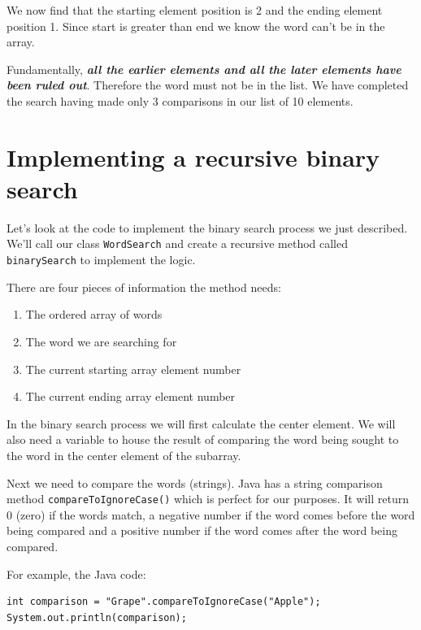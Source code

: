 We now find that the starting element position is 2 and the ending element position 1. Since start is greater than end we know the word can't be in the array. 

Fundamentally, \textbf{\textit{all the earlier elements and all the later elements have been ruled out}}. Therefore the word must not be in the list. We have completed the search having made only 3 comparisons in our list of 10 elements.

\section{Implementing a recursive binary search}

Let's look at the code to implement the binary search process we just described. We'll call our class \texttt{WordSearch} and create a recursive method called \texttt{binarySearch} to implement the logic.


There are four pieces of information the method needs:

\begin{enumerate}
	\item The ordered array of words
	\item The word we are searching for
	\item The current starting array element number
	\item The current ending array element number
\end{enumerate}

In the binary search process we will first calculate the center element. We will also need a variable to house the result of comparing the word being sought to the word in the center element of the subarray.

Next we need to compare the words (strings). Java has a string comparison method \texttt{compareToIgnoreCase()} which is perfect for our purposes. It will return 0 (zero) if the words match, a negative number if the word comes before the word being compared and a positive number if the word comes after the word being compared.


For example, the Java code:

\beforeverb
\begin{verbatim}
int comparison = "Grape".compareToIgnoreCase("Apple");
System.out.println(comparison);
\end{verbatim}
\afterverb

